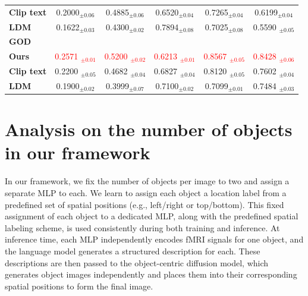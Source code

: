 \begin{table}[t]
{\begin{tabular}{lccccc}
\textbf{Clip text} & 0.2000$_{\pm 0.06}$   & 0.4885$_{\pm 0.06}$ & 0.6520$_{\pm 0.04}$ & 0.7265$_{\pm 0.04}$ & 0.6199$_{\pm 0.04}$ \\

\textbf{LDM} & 0.1622$_{\pm 0.03}$  &0.4300$_{\pm 0.02}$  & 0.7894$_{\pm 0.08}$   & 0.7025$_{\pm 0.08}$ & 0.5590 $_{\pm 0.05}$\\

\midrule
\multicolumn{5}{l}{\textbf{GOD}} &   \\
\midrule



\textbf{Ours} & \textcolor{red}{0.2571 $_{\pm 0.01}$}   & \textcolor{red}{0.5200 $_{\pm 0.02}$} & \textcolor{red}{0.6213 $_{\pm 0.01}$} & \textcolor{red}{0.8567 $_{\pm 0.05}$} & \textcolor{red}{0.8428 $_{\pm 0.06}$} \\

\textbf{Clip text} & 0.2200 $_{\pm 0.05}$  & 0.4682 $_{\pm 0.04}$& 0.6827 $_{\pm 0.04}$ & 0.8120 $_{\pm 0.05}$ & 0.7602 $_{\pm 0.04}$ \\


\textbf{LDM} & 0.1900$_{\pm 0.02}$  & 0.3999$_{\pm 0.07}$  & 0.7100$_{\pm 0.02}$   & 0.7099$_{\pm 0.01}$ & 0.7484 $_{\pm 0.03}$ \\
\bottomrule

\end{tabular}
\label{tb:app_abl_space}

}
\vspace{0.1cm}
\end{table}









\section{Analysis on the number of objects in our framework}
\label{app_mlp}
In our framework, we fix the number of objects per image to two and assign a separate MLP to each. We learn to assign each object a location label from a predefined set of spatial positions (e.g., left/right or top/bottom). This fixed assignment of each object to a dedicated MLP, along with the predefined spatial labeling scheme, is used consistently during both training and inference. At inference time, each MLP independently encodes fMRI signals for one object, and the language model generates a structured description for each. These descriptions are then passed to the object-centric diffusion model, which generates object images independently and places them into their corresponding spatial positions to form the final image.




